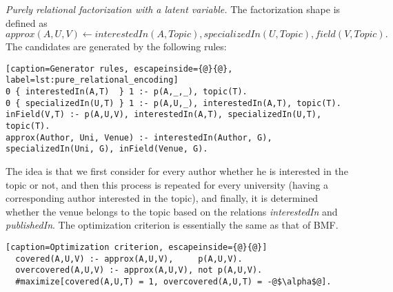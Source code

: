 \textit{Purely relational factorization with a latent variable.} The factorization shape is defined as
\begin{equation*}
  \textit{approx}(A,U,V) \leftarrow \textit{interestedIn}(A, \textit{Topic}), \textit{specializedIn}(U, \textit{Topic}), \textit{field}(V, \textit{Topic}).
\end{equation*}
The candidates are generated by the following rules:
  \begin{lstlisting}[caption=Generator rules, escapeinside={@}{@}, label=lst:pure_relational_encoding] 
0 { interestedIn(A,T)  } 1 :- p(A,_,_), topic(T).
0 { specializedIn(U,T) } 1 :- p(A,U,_), interestedIn(A,T), topic(T).
inField(V,T) :- p(A,U,V), interestedIn(A,T), specializedIn(U,T), topic(T). 
approx(Author, Uni, Venue) :- interestedIn(Author, G), specializedIn(Uni, G), inField(Venue, G).\end{lstlisting}
The idea is that we first consider for every author whether he is interested in the topic or not, 
and then this process is repeated for every university (having a corresponding author interested in the topic), and finally, it is determined whether the venue belongs to the topic based on the relations {\it interestedIn} and {\it publishedIn}. The optimization criterion is essentially the same as that of BMF.
\begin{lstlisting}[caption=Optimization criterion, escapeinside={@}{@}] 
  covered(A,U,V) :- approx(A,U,V),     p(A,U,V).
  overcovered(A,U,V) :- approx(A,U,V), not p(A,U,V).
  #maximize[covered(A,U,T) = 1, overcovered(A,U,T) = -@$\alpha$@].
\end{lstlisting}
